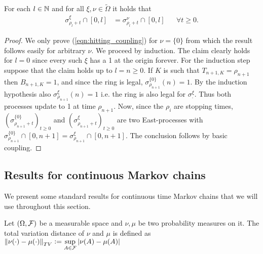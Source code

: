 \begin{proposition}\label{prop:East_linear_coupling}
For each $l \in \N$ and for all $\xi, \nu \in \widetilde{\Omega}$ it holds that 
\begin{align}
\sigma^\xi_{\rho_l + t} \cap [0, l] &= \sigma^\nu_{\rho_l + t} \cap [0, l] &&\forall t \geq 0. \label{eqn:hitting_coupling}
\end{align}
\end{proposition}

\begin{proof}
We only prove (\ref{eqn:hitting_coupling}) for $\nu = \{0\}$ from which the result follows easily for arbitrary $\nu$. We proceed by induction. The claim clearly holds for $l=0$ since every such $\xi$ has a 1 at the origin forever. For the induction step suppose that the claim holds up to $l=n \geq 0$. If $K$ is such that $T_{n+1, K} = \rho_{n+1}$ then $B_{n+1, K}=1$, and since the ring is legal, $\sigma^{\{0\}}_{\rho_{n+1}}(n) = 1$. By the induction hypothesis also $\sigma^\xi_{\rho_{n+1}}(n) = 1$ i.e. the ring is also legal for $\sigma^\xi_.$. Thus both processes update to 1 at time $\rho_{n+1}$. Now, since the $\rho_i$ are stopping times, $(\sigma^{\{0\}}_{\rho_{n+1}+t})_{t \geq 0}$ and $(\sigma^\xi_{\rho_{n+1} + t})_{t \geq 0}$ are two East-processes with $\sigma^{\{0\}}_{\rho_{n+1}} \cap [0, n+1] = \sigma^\xi_{\rho_{n+1}} \cap [0, n+1] $. The conclusion follows by basic coupling. 
\end{proof}

\subsection{Results for continuous Markov chains}
We present some standard results for continuous time Markov chains that we will use throughout this section. 
\begin{definition}
Let $(\Omega, \cal{F})$ be a measurable space and $\nu, \mu$ be two probability measures on it. The total variation distance of $\nu$ and $\mu$ is defined as $\left\Vert \nu(\cdot) - \mu(\cdot) \right\Vert_{TV} \defeq \sup\limits_{A \in \cal{F}} \left| \nu(A) - \mu(A) \right|$
\end{definition}


